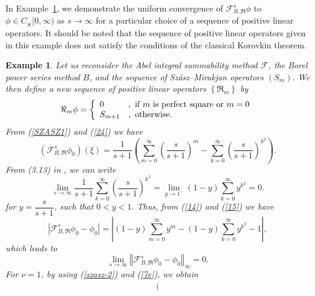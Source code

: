 \documentclass{amsart}
\theoremstyle{plain}
\newtheorem{example}{Example}
\numberwithin{equation}{section}
\begin{document}
In Example~\ref{exmp3}, we demonstrate the uniform convergence of 
\( \mathcal{F}_{B,\Re}^{s}\phi \) to \( \phi \in C_{\divideontimes}[0,\infty) \) 
as \( s \to \infty \) for a particular choice of a sequence of positive linear operators. 
It should be noted that the sequence of positive linear operators given in this example 
does not satisfy the conditions of the classical Korovkin theorem.

\begin{example}
\label{exmp3} Let us reconsider the Abel integral summability method \( \mathcal{F} \), 
the Borel power series method \( B \), and the sequence of 
Sz\'{a}sz--Mirakjan operators \( (S_{m}) \). 
We then define a new sequence of positive linear operators \( \left\{\Re_{m}\right\} \) by
\begin{equation}
\Re_{m}\phi=\left \{
\begin{array}
[c]{ll}%
0 & ,\text{ if }m\text{ is perfect square or }m=0\\
S_{m+1} & ,\text{ otherwise.}%
\end{array}
\right.  \label{23}%
\end{equation}
From (\ref{SZASZ1}) and (\ref{24}) we have%
\begin{equation}
(%
\mathcal{F}%
_{B,\Re}^{s}\phi_{0})(\xi)=\frac{1}{s+1}\left(  \sum_{m=0}^{\infty}\left(
\frac{s}{s+1}\right)  ^{m}-\sum_{k=0}^{\infty}\left(  \frac{s}{s+1}\right)
^{k^{2}}\right)  \text{.}\label{14}%
\end{equation}
From (3.13) in \cite{ulucay-un}, we can write
\begin{equation}
\lim_{s\rightarrow \infty}\frac{1}{s+1}\sum_{k=0}^{\infty}\left(  \frac{s}%
{s+1}\right)  ^{k^{2}}=\lim_{y\rightarrow1^{-}}\left(  1-y\right)  \sum
_{k=0}^{\infty}y^{k^{2}}=0.\label{15}%
\end{equation}
for $y=\dfrac{s}{s+1}$, such that $0<y<1.$ Thus, from (\ref{14}) and
(\ref{15}) we have%
\[
\left \vert
\mathcal{F}%
_{B,\Re}^{s}\phi_{0}-\phi_{0}\right \vert =\left \vert (1-y)\sum_{m=0}^{\infty
}y^{m}-\left(  1-y\right)  \sum_{k=0}^{\infty}y^{k^{2}}-1\right \vert ,
\]
which leads to%
\[
\lim_{s\rightarrow \infty}\left \Vert
\mathcal{F}%
_{B,\Re}^{s}\phi_{0}-\phi_{0}\right \Vert _{\infty}=0\text{.}%
\]
For $\nu=1$, by using (\ref{szasz-2}) and (\ref{7e}), we obtain$\ $%
\begin{align*}
(%

\end{align*}
\end{example}
\end{document}
